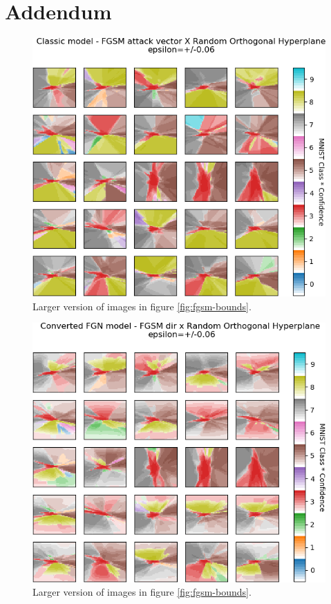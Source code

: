 \documentclass[12pt,oneside]{CUNY_PhD}
\begin{document}
\chapter{Addendum}
\begin{figure}
    \centering
    \includegraphics[width=\textwidth]{images/observations/classic-bounds.png}
    \caption*{Larger version of images in figure \ref{fig:fgsm-bounds}.}
\end{figure}
\begin{figure}
    \centering
    \includegraphics[width=\textwidth]{images/observations/converted-bounds.png}
    \caption*{Larger version of images in figure \ref{fig:fgsm-bounds}.}
\end{figure}
\end{document}
